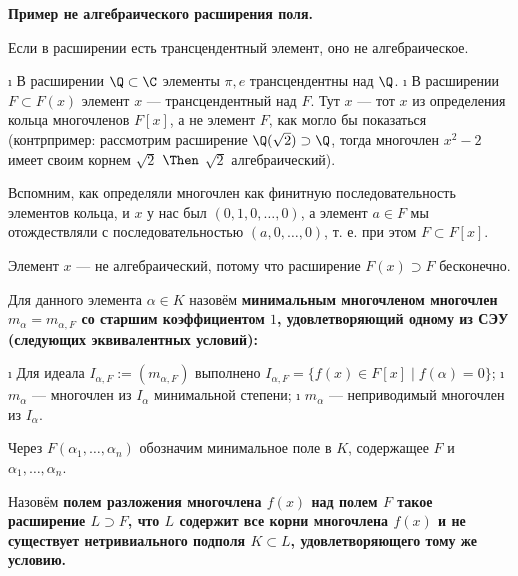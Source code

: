 \begin{defn}
\bf{Пример не алгебраического расширения поля.}

Если в расширении есть трансцендентный элемент, оно не алгебраическое.

\begin{itemize}
\tightlist
\i
  В расширении \(\Q \subset \C\) элементы \(\pi, e\) трансцендентны над \(\Q\).
\i
  В расширении \(F \subset F(x)\) элемент \(x\) --- трансцендентный над \(F\). Тут \(x\) --- тот $x$ из определения кольца многочленов $F[x]$, а не элемент \(F\), как могло бы показаться (контрпример: рассмотрим расширение \(\Q(\sqrt{2}) \supset \Q\), тогда многочлен \(x^2-2\) имеет своим корнем \(\sqrt{2}\) \(\Then\) \(\sqrt{2}\) алгебраический).
  
  Вспомним, как определяли многочлен как финитную последовательность элементов кольца, и $x$ у нас был $(0, 1, 0, \dots, 0)$, а элемент $a \in F$ мы отождествляли с последовательностью $(a, 0, \dots, 0)$, т. е. при этом $F \subset F[x]$.
  
  Элемент $x$ --- не алгебраический, потому что расширение $F(x) \supset F$ бесконечно.
\end{itemize}

\end{defn}

\begin{defn}
Для данного элемента \(\alpha \in K\) назовём \bf{минимальным многочленом} многочлен \(m_{\alpha} = m_{\alpha,F}\) со старшим коэффициентом \(1\), удовлетворяющий одному из СЭУ (следующих эквивалентных условий):

\begin{enumerate}
\def\labelenumi{\arabic{enumi}.}
\tightlist
\i
  Для идеала \(I_{\alpha, F} := (m_{\alpha, F})\) выполнено \(I_{\alpha,F} = \{f(x) \in F[x] \mid f(\alpha)=0\}\);
\i
  \(m_{\alpha}\) --- многочлен из \(I_{\alpha}\) минимальной степени;
\i
  \(m_{\alpha}\) --- неприводимый многочлен из \(I_{\alpha}\).
\end{enumerate}

\end{defn}

\begin{defn}
Через \(F(\alpha_1,\ldots,\alpha_n)\) обозначим минимальное поле в \(K\), содержащее \(F\) и \(\alpha_1,\ldots,\alpha_n\).
\end{defn}

\begin{defn}
Назовём \bf{полем разложения} многочлена \(f(x)\) над полем \(F\) такое расширение \(L \supset F\), что \(L\) содержит все корни многочлена \(f(x)\) и не существует нетривиального подполя \(K \subset L\), удовлетворяющего тому же условию.
\end{defn}

